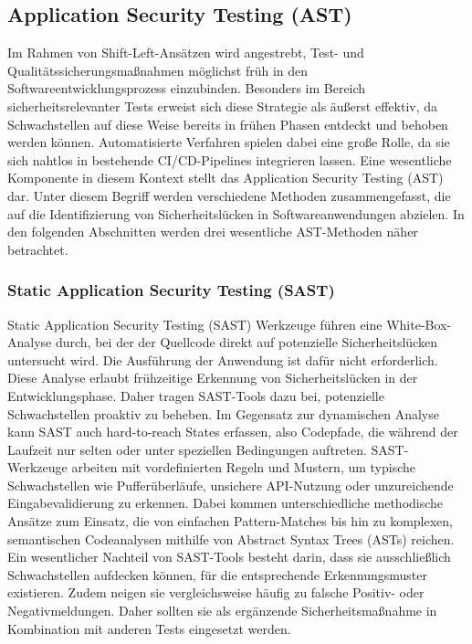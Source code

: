 \documentclass[acmtog]{acmart}
\begin{document}
\subsection{Application Security Testing (AST)}
Im Rahmen von Shift-Left-Ansätzen wird angestrebt, Test- und Qualitätssicherungsmaßnahmen möglichst früh in den Softwareentwicklungsprozess einzubinden.
Besonders im Bereich sicherheitsrelevanter Tests erweist sich diese Strategie als äußerst effektiv, da Schwachstellen auf diese Weise bereits in frühen Phasen entdeckt und behoben werden können.
Automatisierte Verfahren spielen dabei eine große Rolle, da sie sich nahtlos in bestehende CI/CD-Pipelines integrieren lassen. 
Eine wesentliche Komponente in diesem Kontext stellt das Application Security Testing (AST) dar. 
Unter diesem Begriff werden verschiedene Methoden zusammengefasst, die auf die Identifizierung von Sicherheitslücken in Softwareanwendungen abzielen.
In den folgenden Abschnitten werden drei wesentliche AST-Methoden näher betrachtet.

\subsubsection{Static Application Security Testing (SAST)}
Static Application Security Testing (SAST) Werkzeuge führen eine White-Box-Analyse durch, bei der der Quellcode direkt auf potenzielle Sicherheitslücken untersucht wird.
Die Ausführung der Anwendung ist dafür nicht erforderlich.
Diese Analyse erlaubt frühzeitige Erkennung von Sicherheitslücken in der Entwicklungsphase. 
Daher tragen SAST-Tools dazu bei, potenzielle Schwachstellen proaktiv zu beheben. 
Im Gegensatz zur dynamischen Analyse kann SAST auch hard-to-reach States erfassen, also Codepfade, die während der Laufzeit nur selten oder unter speziellen Bedingungen auftreten.
SAST-Werkzeuge arbeiten mit vordefinierten Regeln und Mustern, um typische Schwachstellen wie Pufferüberläufe, unsichere API-Nutzung oder unzureichende Eingabevalidierung zu erkennen.
Dabei kommen unterschiedliche methodische Ansätze zum Einsatz, die von einfachen Pattern-Matches bis hin zu komplexen, semantischen Codeanalysen mithilfe von Abstract Syntax Trees (ASTs) reichen.
Ein wesentlicher Nachteil von SAST-Tools besteht darin, dass sie ausschließlich Schwachstellen aufdecken können, für die entsprechende Erkennungsmuster existieren.
Zudem neigen sie vergleichsweise häufig zu falsche Positiv- oder Negativmeldungen.
Daher sollten sie als ergänzende Sicherheitsmaßnahme in Kombination mit anderen Tests eingesetzt werden. \cite{chess_static_2004}
\end{document}
